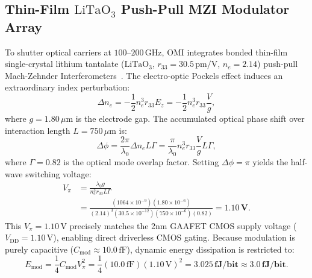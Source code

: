 \documentclass[journal]{IEEEtran}
\begin{document}
\subsection{Thin-Film $\text{LiTaO}_3$ Push-Pull MZI Modulator Array}
To shutter optical carriers at $100\text{--}200\,\text{GHz}$, OMI integrates bonded thin-film single-crystal lithium tantalate ($\text{LiTaO}_3$, $r_{33} = 30.5\,\text{pm/V}$, $n_e = 2.14$) push-pull Mach-Zehnder Interferometers~\cite{wang2024lithium}. The electro-optic Pockels effect induces an extraordinary index perturbation:
\begin{equation}
    \Delta n_e = -\frac{1}{2} n_e^3 r_{33} E_z = -\frac{1}{2} n_e^3 r_{33} \frac{V}{g},
\end{equation}
where $g = 1.80\,\mu\text{m}$ is the electrode gap. The accumulated optical phase shift over interaction length $L = 750\,\mu\text{m}$ is:
\begin{equation}
    \Delta \phi = \frac{2\pi}{\lambda_0} \Delta n_e L \Gamma = \frac{\pi}{\lambda_0} n_e^3 r_{33} \frac{V}{g} L \Gamma,
\end{equation}
where $\Gamma = 0.82$ is the optical mode overlap factor. Setting $\Delta \phi = \pi$ yields the half-wave switching voltage:
\begin{align}
    V_\pi &= \frac{\lambda_0 g}{n_e^3 r_{33} L \Gamma} \nonumber \\
    &= \frac{(1064 \times 10^{-9}) (1.80 \times 10^{-6})}{(2.14)^3 (30.5 \times 10^{-12}) (750 \times 10^{-6}) (0.82)} = \mathbf{1.10\,\text{V}}.
\end{align}
This $V_\pi = 1.10\,\text{V}$ precisely matches the 2nm GAAFET CMOS supply voltage ($V_{\text{DD}} = 1.10\,\text{V}$), enabling direct driverless CMOS gating. Because modulation is purely capacitive ($C_{\text{mod}} \approx 10.0\,\text{fF}$), dynamic energy dissipation is restricted to:
\begin{equation}
    E_{\text{mod}} = \frac{1}{4} C_{\text{mod}} V_\pi^2 = \frac{1}{4} (10.0\,\text{fF}) (1.10\,\text{V})^2 = \mathbf{3.025\,\text{fJ/bit}} \approx \mathbf{3.0\,\text{fJ/bit}}.
\end{equation}
\end{document}
